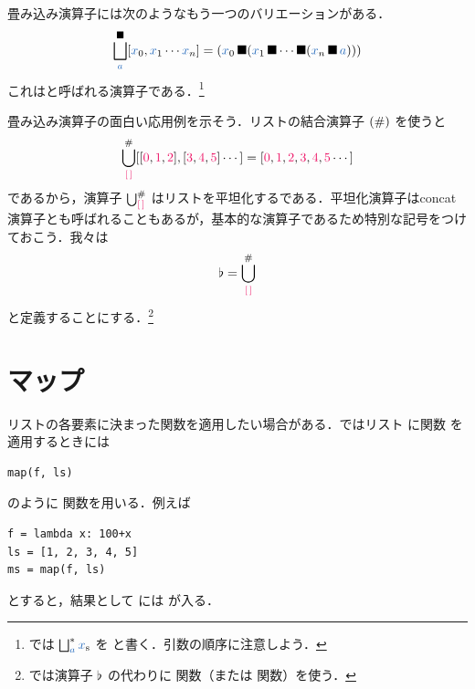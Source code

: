 \documentclass[a5paper,twoside,fleqn,draft]{jsbook}
\begin{document}
\separator

畳み込み演算子には次のようなもう一つのバリエーションがある．
\begin{equation}
  \hFoldRight^{\hAnyBinOp}_{\hVar{a}}[\hVar{x}_0,\hVar{x}_1\dotsb \hVar{x}_n]
  =(\hVar{x}_0\hAnyBinOp(\hVar{x}_1\hAnyBinOp\dotsb\hAnyBinOp(\hVar{x}_n\hAnyBinOp\hVar{a})))
\end{equation}
これはと呼ばれる演算子である．\footnote{\haskell では $\hFoldRight^{*}_{\hVar{a}}\hListVar{x}$ を  と書く．引数の順序に注意しよう．}

\separator

畳み込み演算子の面白い応用例を示そう．リストの結合演算子 $(\operatorname{\#})$ を使うと
\begin{equation}
  \hFold_{\hEmptyList}^{\hAppend}[[\hConstant{0},\hConstant{1},\hConstant{2}],[\hConstant{3},\hConstant{4},\hConstant{5}]\dotsb]
  =[\hConstant{0},\hConstant{1},\hConstant{2},\hConstant{3},\hConstant{4},\hConstant{5}\dotsb]
\end{equation}
であるから，演算子 $\hFold_{\hEmptyList}^{\hAppend}$ はリストを平坦化するである．平坦化演算子はconcat演算子とも呼ばれることもあるが，基本的な演算子であるため特別な記号をつけておこう．我々は
\begin{equation}
  \hJoinList
  =\hFold_{\hEmptyList}^{\hAppend}
\end{equation}
と定義することにする．\footnote{\haskell では演算子 $\operatorname{\flat}$ の代わりに  関数（または  関数）を使う．}

\section{マップ}

リストの各要素に決まった関数を適用したい場合がある．\python ではリスト  に関数  を適用するときには
\begin{pythoncode}
\begin{verbatim}
map(f, ls)
\end{verbatim}
\end{pythoncode}
のように  関数を用いる．例えば
\begin{pythoncode}
\begin{verbatim}
f = lambda x: 100+x
ls = [1, 2, 3, 4, 5]
ms = map(f, ls)
\end{verbatim}
\end{pythoncode}
とすると，結果として  には \code{[101, 102, 103, 104, 105]} が入る．
\end{document}
